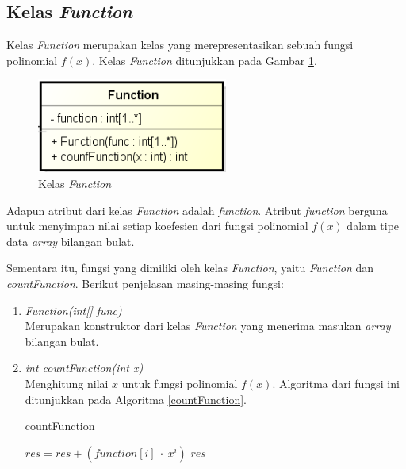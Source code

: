 \subsection{Kelas \textit{Function}}

Kelas \textit{Function} merupakan kelas yang merepresentasikan sebuah fungsi polinomial \begin{math}f(x)\end{math}. Kelas \textit{Function} ditunjukkan pada Gambar \ref{fig:classfunction}.

\begin{figure}[H]
	\centering
	\includegraphics[scale=0.7]{Gambar/class_function}
	\caption{Kelas \textit{Function}}\label{fig:classfunction}
\end{figure}

Adapun atribut dari kelas \textit{Function} adalah \textit{function}. Atribut \textit{function} berguna untuk menyimpan nilai setiap koefesien dari fungsi polinomial \begin{math}f(x)\end{math} dalam tipe data \textit{array} bilangan bulat.

Sementara itu, fungsi yang dimiliki oleh kelas \textit{Function}, yaitu \textit{Function} dan \textit{countFunction}. Berikut penjelasan masing-masing fungsi:

\begin{enumerate}
	\item \textit{Function(int[] func)} \\
	Merupakan konstruktor dari kelas \textit{Function} yang menerima masukan \textit{array} bilangan bulat.
	\item \textit{int countFunction(int x)} \\
	Menghitung nilai \begin{math}x\end{math} untuk fungsi polinomial \begin{math}f(x)\end{math}. Algoritma dari fungsi ini ditunjukkan pada Algoritma \ref{countFunction}.
	\begin{algorithm}
		\caption{countFunction}
		\label{countFunction}
		\begin{algorithmic}[1]
					\State \begin{math}res = res + (function[i]\: \cdot\: x^i)\end{math}
				\EndFor
				\State \Return \begin{math}res\end{math}
			\EndFunction
		\end{algorithmic}
	\end{algorithm}
\end{enumerate}

